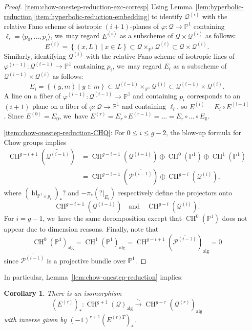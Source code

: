 \documentclass[JEP,XML,SOM,Unicode,NoEqCountersInSection,published]{cedram}
\let\bb\mathbb\let\Bbb\mathbb
\theoremstyle{plain}
\newtheorem{cor}[thm]{Corollary}
\theoremstyle{definition}
\DeclareMathOperator{\alg}{alg}
\DeclareMathOperator{\bl}{bl}
\DeclareMathOperator{\CH}{CH}
\let\phi\varphi
\renewcommand\P{\mathbb{P}}
\begin{document}
\skpt\begin{proof}
\eqref{item:chow-onestep-reduction-exc-corresp}
Using Lemma~\ref{lem:hyperbolic-reduction}\eqref{item:hyperbolic-reduction-embedding} to identify $\mathcal{Q}^{(i)}$ with the relative Fano scheme of isotropic $(i+1)$-planes of $\phi\colon\mathcal{Q}\to \P^1$ containing $\ell_i=\langle p_0,\dots, p_i\rangle$, we~may regard $E^{(i)}$ as a subscheme of $\mathcal{Q}\times \mathcal{Q}^{(i)}$ as follows:
\[
E^{(i)}=\left\{(x,L)\mid x \in L\right\}\subset \mathcal{Q}\times_{\P^1} \mathcal{Q}^{(i)}\subset \mathcal{Q}\times \mathcal{Q}^{(i)}.
\]
Similarly, identifying $\mathcal{Q}^{(i)}$ with the relative Fano scheme of isotropic lines of $\phi^{(i-1)}\colon\mathcal{Q}^{(i-1)}\to \P^1$ containing $p_i$, we~may regard $E_i$ as a subscheme of $\mathcal{Q}^{(i-1)}\times \mathcal{Q}^{(i)}$ as follows:
\[
E_i=\left\{(y, m)\mid y\in m \right\}\subset \mathcal{Q}^{(i-1)}\times_{\P^1}
\mathcal{Q}^{(i)}\subset \mathcal{Q}^{(i-1)}\times \mathcal{Q}^{(i)}.
\]
A line on a fiber of $\phi^{(i-1)}\colon\mathcal{Q}^{(i-1)}\to \P^1$ and containing $p_i$ corresponds to an $(i+1)$-plane on a fiber of $\phi\colon\mathcal{Q}\to \P^1$ and containing $\ell_i$, so $E^{(i)}=E_i\circ E^{(i-1)}$.
Since \(E^{(0)} = E_0\), we~have $E^{(r)}=E_r\circ E^{(r-1)}=\dots =E_r\circ\dots\circ E_0$.

\eqref{item:chow-onestep-reduction-CHQ}:
For $0\leq i\leq g-2$,
the blow-up formula for Chow groups implies
\begin{align*}
\CH^{g-i+1}(\widetilde{\mathcal{Q}^{(i-1)}})
&=\CH^{g-i+1}(\mathcal{Q}^{(i-1)})\oplus \CH^0(\P^1)\oplus \CH^1(\P^1)\\
&=\CH^{g-i+1}(\overline{\mathcal{P}^{(i-1)}})\oplus \CH^{g-i}(\mathcal{Q}^{(i)}),
\end{align*}
where $(\bl_{\P^1\times p_i})_*?$ and $-\pi_*(?|_{E_i})$ respectively define the projectors onto
\[
\CH^{g-i+1}(\mathcal{Q}^{(i-1)})\quad\text{and}\quad \CH^{g-i}(\mathcal{Q}^{(i)}).
\]
For $i=g-1$, we~have the same decomposition except that $\CH^0(\P^1)$ does not appear due to dimension reasons.
Finally, note that
\[
\CH^{0}(\P^1)_{\alg} = \CH^1(\P^1)_{\alg} = \CH^{g-i+1}(\overline{\mathcal{P}^{(i-1)}})_{\alg}=0
\]
since \(\overline{\mathcal{P}^{(i-1)}}\) is a projective bundle over \(\bb P^1\).
\end{proof}

In particular, Lemma~\ref{lem:chow-onestep-reduction} implies:
\begin{cor}\label{cor:Er-action-on-alg}
There is an isomorphism
\[
(E^{(r)})_*\colon \CH^{g+1}(\mathcal{Q})_{\alg}\xrightarrow{\;\sim\;} \CH^{g-r}(\mathcal{Q}^{(r)})_{\alg}
\]
with inverse given by $(-1)^{r+1}(E^{(r)T})_*$.
\end{cor}
\end{document}
